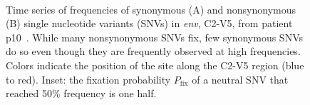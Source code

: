 \documentclass[rmp, twocolumn]{revtex4}
\newcommand{\pfix}{P_{\mathrm{fix}}}
\newcommand{\env}{\textit{env}}
\newcommand{\shankaregion}{C2-V5}
\begin{document}
\begin{figure}
\begin{center}
\\
\caption{Time series of frequencies
of synonymous (A) and nonsynonymous (B) single nucleotide variants (SNVs) in \env, 
\shankaregion, from patient p10~\cite{shankarappa_consistent_1999}.
While many nonsynonymous SNVs fix, few synonymous
SNVs do so even though they are frequently observed at high
frequencies. Colors indicate the position of the site along the \shankaregion{} region
(blue to red). Inset: the fixation probability $\pfix$ of a neutral
SNV that reached 50\% frequency is one half.}
\label{fig:aft}
\end{center}
\end{figure}
\end{document}
